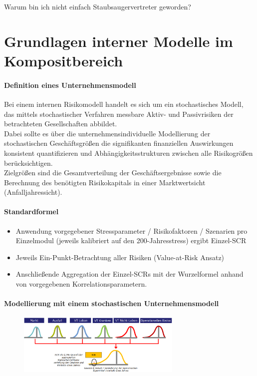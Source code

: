 \documentclass[12pt]{report}
\theoremstyle{dotless}
\theoremstyle{definition}
\begin{document}
\begin{titlepage}
	Warum bin ich nicht einfach Staubsaugervertreter geworden?
\end{titlepage}

\tableofcontents


\chapter{Grundlagen interner Modelle im Kompositbereich}

\subsubsection{Definition eines Unternehmensmodell}
Bei einem internen Risikomodell handelt es sich um ein stochastisches Modell, das mittels stochastischer Verfahren messbare Aktiv- und Passivrisiken der betrachteten Gesellschaften abbildet. \\
Dabei sollte es über die unternehmensindividuelle Modellierung der stochastischen Geschäftsgrößen die signifikanten finanziellen Auswirkungen konsistent quantifizieren und Abhängigkeitsstrukturen zwischen alle Risikogrößen berücksichtigen.\\
Zielgrößen sind die Gesamtverteilung der Geschäftsergebnisse sowie die Berechnung des benötigten Risikokapitals in einer Marktwertsicht (Anfalljahressicht).

\subsubsection{Standardformel}
\begin{itemize}
\item Anwendung vorgegebener Stressparameter / Risikofaktoren / Szenarien pro Einzelmodul (jeweils kalibriert auf den 200-Jahresstress) ergibt Einzel-SCR
\item Jeweils Ein-Punkt-Betrachtung aller Risiken (Value-at-Risk Ansatz)
\item Anschließende Aggregation der Einzel-SCRs mit der Wurzelformel anhand von vorgegebenen Korrelationsparametern.
\end{itemize}

\subsubsection{Modellierung mit einem stochastischen Unternehmensmodell}

\begin{figure}[ht]
	\centering
	\includegraphics[width= 0.7\textwidth]{Bilder/StochUnternehmensmodell.png}
\end{figure}
\end{document}
